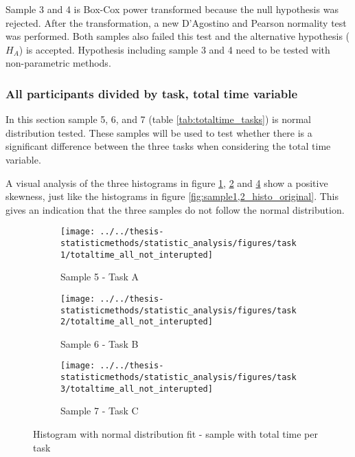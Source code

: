 Sample 3 and 4 is Box-Cox power transformed because the null hypothesis was rejected. After the transformation, a new D'Agostino and Pearson normality test was performed. Both samples also failed this test and the alternative hypothesis ($H_A$) is accepted. Hypothesis including sample 3 and 4 need to be tested with non-parametric methods. 

\subsubsection[Sample 5, 6 and 7]{All participants divided by task, total time variable}\label{sec:task123_time_normaltest}

In this section sample 5, 6, and 7 (table \ref{tab:totaltime_tasks}) is normal distribution tested. These samples will be used to test whether there is a significant difference between the three tasks when considering the total time variable. 

A visual analysis of the three histograms in figure \ref{fig:totaltimeallnotinterupted_task1}, \ref{fig:totaltimeallnotinterupted_task2} and \ref{fig:totaltimeallnotinterupted_task3} show a positive skewness, just like the histograms in figure \ref{fig:sample1,2_histo_original}. This gives an indication that the three samples do not follow the normal distribution. 

\begin{figure}[h!]
	\centering
	\begin{subfigure}[b]{0.3\textwidth}
		\centering
		\texttt{[image: ../../thesis-statisticmethods/statistic\_analysis/figures/task1/totaltime\_all\_not\_interupted]}
		\caption{Sample 5 - Task A}
		\label{fig:totaltimeallnotinterupted_task1}
	\end{subfigure}
	\begin{subfigure}[b]{0.3\textwidth}
		\centering
		\texttt{[image: ../../thesis-statisticmethods/statistic\_analysis/figures/task2/totaltime\_all\_not\_interupted]}
		\caption{Sample 6 - Task B}
		\label{fig:totaltimeallnotinterupted_task2}
	\end{subfigure}
	\begin{subfigure}[b]{0.3\textwidth}
		\centering
		\texttt{[image: ../../thesis-statisticmethods/statistic\_analysis/figures/task3/totaltime\_all\_not\_interupted]}
		\caption{Sample 7 - Task C}
		\label{fig:totaltimeallnotinterupted_task3}
	\end{subfigure}
	\caption{Histogram with normal distribution fit - sample with total time per task}
\end{figure}

